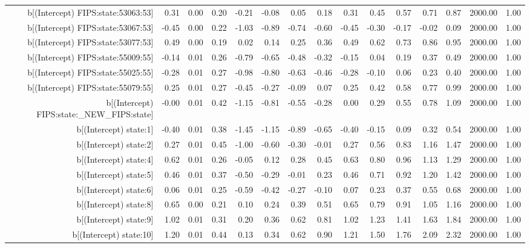\begin{table}[ht]
\begin{tabular}{rrrrrrrrrrrrrrr}
  b[(Intercept) FIPS:state:53063:53] & 0.31 & 0.00 & 0.20 & -0.21 & -0.08 & 0.05 & 0.18 & 0.31 & 0.45 & 0.57 & 0.71 & 0.87 & 2000.00 & 1.00 \\ 
  b[(Intercept) FIPS:state:53067:53] & -0.45 & 0.00 & 0.22 & -1.03 & -0.89 & -0.74 & -0.60 & -0.45 & -0.30 & -0.17 & -0.02 & 0.09 & 2000.00 & 1.00 \\ 
  b[(Intercept) FIPS:state:53077:53] & 0.49 & 0.00 & 0.19 & 0.02 & 0.14 & 0.25 & 0.36 & 0.49 & 0.62 & 0.73 & 0.86 & 0.95 & 2000.00 & 1.00 \\ 
  b[(Intercept) FIPS:state:55009:55] & -0.14 & 0.01 & 0.26 & -0.79 & -0.65 & -0.48 & -0.32 & -0.15 & 0.04 & 0.19 & 0.37 & 0.49 & 2000.00 & 1.00 \\ 
  b[(Intercept) FIPS:state:55025:55] & -0.28 & 0.01 & 0.27 & -0.98 & -0.80 & -0.63 & -0.46 & -0.28 & -0.10 & 0.06 & 0.23 & 0.40 & 2000.00 & 1.00 \\ 
  b[(Intercept) FIPS:state:55079:55] & 0.25 & 0.01 & 0.27 & -0.45 & -0.27 & -0.09 & 0.07 & 0.25 & 0.42 & 0.58 & 0.77 & 0.99 & 2000.00 & 1.00 \\ 
  b[(Intercept) FIPS:state:\_NEW\_FIPS:state] & -0.00 & 0.01 & 0.42 & -1.15 & -0.81 & -0.55 & -0.28 & 0.00 & 0.29 & 0.55 & 0.78 & 1.09 & 2000.00 & 1.00 \\ 
  b[(Intercept) state:1] & -0.40 & 0.01 & 0.38 & -1.45 & -1.15 & -0.89 & -0.65 & -0.40 & -0.15 & 0.09 & 0.32 & 0.54 & 2000.00 & 1.00 \\ 
  b[(Intercept) state:2] & 0.27 & 0.01 & 0.45 & -1.00 & -0.60 & -0.30 & -0.01 & 0.27 & 0.56 & 0.83 & 1.16 & 1.47 & 2000.00 & 1.00 \\ 
  b[(Intercept) state:4] & 0.62 & 0.01 & 0.26 & -0.05 & 0.12 & 0.28 & 0.45 & 0.63 & 0.80 & 0.96 & 1.13 & 1.29 & 2000.00 & 1.00 \\ 
  b[(Intercept) state:5] & 0.46 & 0.01 & 0.37 & -0.50 & -0.29 & -0.01 & 0.23 & 0.46 & 0.71 & 0.92 & 1.20 & 1.42 & 2000.00 & 1.00 \\ 
  b[(Intercept) state:6] & 0.06 & 0.01 & 0.25 & -0.59 & -0.42 & -0.27 & -0.10 & 0.07 & 0.23 & 0.37 & 0.55 & 0.68 & 2000.00 & 1.00 \\ 
  b[(Intercept) state:8] & 0.65 & 0.00 & 0.21 & 0.10 & 0.24 & 0.39 & 0.51 & 0.65 & 0.79 & 0.91 & 1.05 & 1.16 & 2000.00 & 1.00 \\ 
  b[(Intercept) state:9] & 1.02 & 0.01 & 0.31 & 0.20 & 0.36 & 0.62 & 0.81 & 1.02 & 1.23 & 1.41 & 1.63 & 1.84 & 2000.00 & 1.00 \\ 
  b[(Intercept) state:10] & 1.20 & 0.01 & 0.44 & 0.13 & 0.34 & 0.62 & 0.90 & 1.21 & 1.50 & 1.76 & 2.09 & 2.32 & 2000.00 & 1.00 \\ 

\end{tabular}
\end{table}

